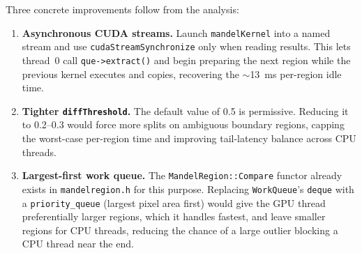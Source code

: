\documentclass[
	english,
	letterpaper, oneside
]{article}
\begin{document}
Three concrete improvements follow from the analysis:

\begin{enumerate}
    \item \textbf{Asynchronous CUDA streams.} Launch \texttt{mandelKernel}
    into a named stream and use \texttt{cudaStreamSynchronize} only when
    reading results. This lets thread~0 call \texttt{que->extract()} and
    begin preparing the next region while the previous kernel executes and
    copies, recovering the $\sim$13~ms per-region idle time.

    \item \textbf{Tighter \texttt{diffThreshold}.} The default value of 0.5
    is permissive. Reducing it to 0.2--0.3 would force more splits on
    ambiguous boundary regions, capping the worst-case per-region time and
    improving tail-latency balance across CPU threads.

    \item \textbf{Largest-first work queue.} The \texttt{MandelRegion::Compare}
    functor already exists in \texttt{mandelregion.h} for this purpose.
    Replacing \texttt{WorkQueue}'s \texttt{deque} with a \texttt{priority\_queue}
    (largest pixel area first) would give the GPU thread preferentially
    larger regions, which it handles fastest, and leave smaller regions for
    CPU threads, reducing the chance of a large outlier blocking a CPU
    thread near the end.
\end{enumerate}

\end{document}
